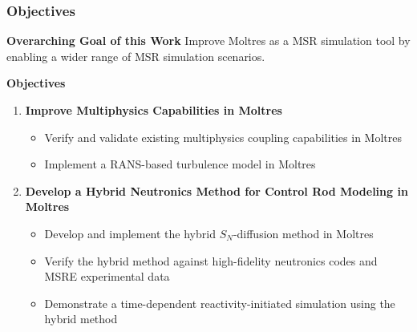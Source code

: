 \begin{frame}
  \frametitle{Objectives}
  \begin{block}{\textbf{Overarching Goal of this Work}}
    Improve Moltres as a MSR simulation tool by enabling a wider range of MSR simulation
    scenarios.
  \end{block}
  \begin{block}{\textbf{Objectives}}
    \begin{enumerate}
      \item \textbf{Improve Multiphysics Capabilities in Moltres}
      \begin{itemize}
        \item Verify and validate existing multiphysics coupling capabilities in Moltres
        \item Implement a RANS-based turbulence model in Moltres
      \end{itemize}
      \item \textbf{Develop a Hybrid Neutronics Method for Control Rod Modeling in Moltres}
      \begin{itemize}
        \item Develop and implement the hybrid $S_N$-diffusion method in Moltres
        \item Verify the hybrid method against high-fidelity neutronics codes and MSRE
          experimental data
        \item Demonstrate a time-dependent reactivity-initiated simulation using the hybrid
          method
      \end{itemize}
    \end{enumerate}
  \end{block}
\end{frame}
